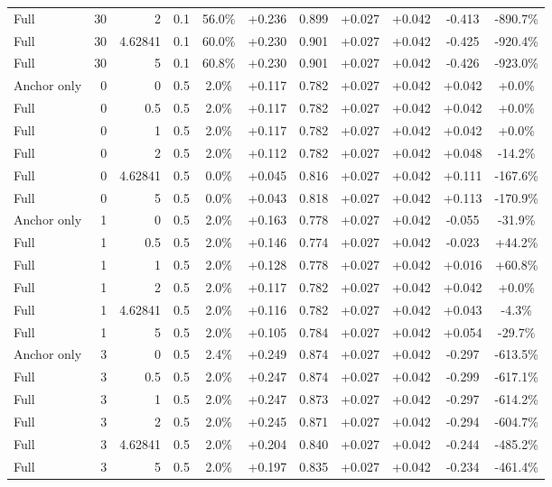 \begin{table}[htbp]
\begin{tabular}{lrrrccccccc}
Full & 30 & 2 & 0.1 & 56.0\% & +0.236 & 0.899 & +0.027 & +0.042 & -0.413 & -890.7\% \\
Full & 30 & 4.62841 & 0.1 & 60.0\% & +0.230 & 0.901 & +0.027 & +0.042 & -0.425 & -920.4\% \\
Full & 30 & 5 & 0.1 & 60.8\% & +0.230 & 0.901 & +0.027 & +0.042 & -0.426 & -923.0\% \\
Anchor only & 0 & 0 & 0.5 & 2.0\% & +0.117 & 0.782 & +0.027 & +0.042 & +0.042 & +0.0\% \\
Full & 0 & 0.5 & 0.5 & 2.0\% & +0.117 & 0.782 & +0.027 & +0.042 & +0.042 & +0.0\% \\
Full & 0 & 1 & 0.5 & 2.0\% & +0.117 & 0.782 & +0.027 & +0.042 & +0.042 & +0.0\% \\
Full & 0 & 2 & 0.5 & 2.0\% & +0.112 & 0.782 & +0.027 & +0.042 & +0.048 & -14.2\% \\
Full & 0 & 4.62841 & 0.5 & 0.0\% & +0.045 & 0.816 & +0.027 & +0.042 & +0.111 & -167.6\% \\
Full & 0 & 5 & 0.5 & 0.0\% & +0.043 & 0.818 & +0.027 & +0.042 & +0.113 & -170.9\% \\
Anchor only & 1 & 0 & 0.5 & 2.0\% & +0.163 & 0.778 & +0.027 & +0.042 & -0.055 & -31.9\% \\
Full & 1 & 0.5 & 0.5 & 2.0\% & +0.146 & 0.774 & +0.027 & +0.042 & -0.023 & +44.2\% \\
Full & 1 & 1 & 0.5 & 2.0\% & +0.128 & 0.778 & +0.027 & +0.042 & +0.016 & +60.8\% \\
Full & 1 & 2 & 0.5 & 2.0\% & +0.117 & 0.782 & +0.027 & +0.042 & +0.042 & +0.0\% \\
Full & 1 & 4.62841 & 0.5 & 2.0\% & +0.116 & 0.782 & +0.027 & +0.042 & +0.043 & -4.3\% \\
Full & 1 & 5 & 0.5 & 2.0\% & +0.105 & 0.784 & +0.027 & +0.042 & +0.054 & -29.7\% \\
Anchor only & 3 & 0 & 0.5 & 2.4\% & +0.249 & 0.874 & +0.027 & +0.042 & -0.297 & -613.5\% \\
Full & 3 & 0.5 & 0.5 & 2.0\% & +0.247 & 0.874 & +0.027 & +0.042 & -0.299 & -617.1\% \\
Full & 3 & 1 & 0.5 & 2.0\% & +0.247 & 0.873 & +0.027 & +0.042 & -0.297 & -614.2\% \\
Full & 3 & 2 & 0.5 & 2.0\% & +0.245 & 0.871 & +0.027 & +0.042 & -0.294 & -604.7\% \\
Full & 3 & 4.62841 & 0.5 & 2.0\% & +0.204 & 0.840 & +0.027 & +0.042 & -0.244 & -485.2\% \\
Full & 3 & 5 & 0.5 & 2.0\% & +0.197 & 0.835 & +0.027 & +0.042 & -0.234 & -461.4\% \\

\end{tabular}
\end{table}
